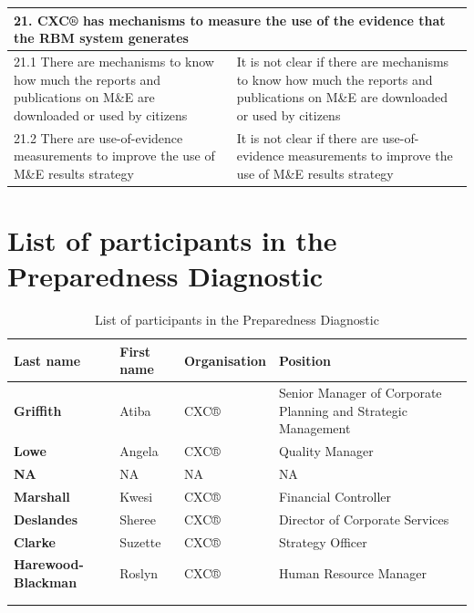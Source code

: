 \documentclass[
  10pt,
]{book}
\begin{document}
\begin{table}
\begin{tabular}[t]{l|l}
\hline
\multicolumn{2}{l}{\textbf{21. CXC® has mechanisms to measure the use of the evidence that the RBM system generates}}\\
\hline
\hspace{1em}21.1 There are mechanisms to know how much the reports and publications on M\&E are downloaded or used by citizens & It is not clear if there are mechanisms to know how much the reports and publications on M\&E are downloaded or used by citizens\\
\hline
\hspace{1em}21.2 There are use-of-evidence measurements to improve the use of M\&E results strategy & It is not clear if there are use-of-evidence measurements to improve the use of M\&E results strategy\\
\hline
\end{tabular}
\end{table}

\hypertarget{appendixC}{%
\chapter{List of participants in the Preparedness Diagnostic}\label{appendixC}}

\begin{table}

\caption{\label{tab:unnamed-chunk-14}List of participants in the Preparedness Diagnostic}
\centering
\fontsize{15}{17}\selectfont
\begin{tabu} to 
\hline
Last name & First name & Organisation & Position\\
\hline
\textbf{Griffith} & Atiba & CXC® & Senior Manager of Corporate Planning and Strategic Management\\
\hline
\textbf{Lowe} & Angela & CXC® & Quality Manager\\
\hline
\textbf{NA} & NA & NA & NA\\
\hline
\textbf{Marshall} & Kwesi & CXC® & Financial Controller\\
\hline
\textbf{Deslandes} & Sheree & CXC® & Director of Corporate Services\\
\hline
\textbf{Clarke} & Suzette & CXC® & Strategy Officer\\
\hline
\textbf{Harewood-Blackman} & Roslyn & CXC® & Human Resource Manager\\
\hline
{}\\
\\
\end{tabu}
\end{table}
\end{document}
